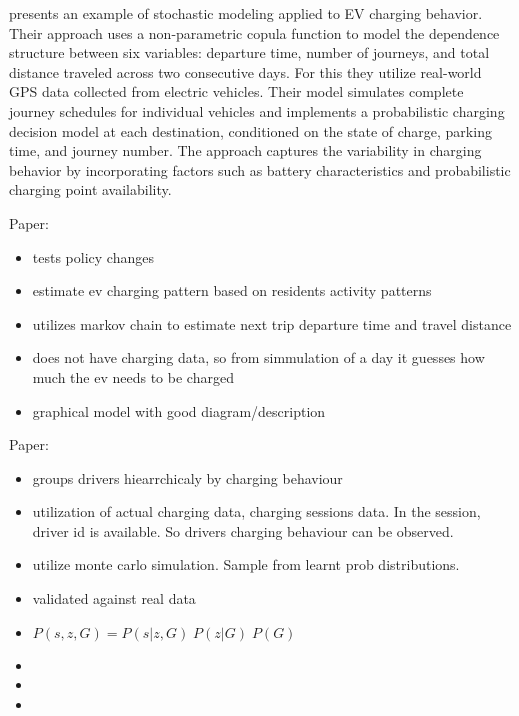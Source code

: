  presents an example of stochastic modeling applied to EV charging behavior. Their approach uses a non-parametric copula function to model the dependence structure between six variables: departure time, number of journeys, and total distance traveled across two consecutive days. For this they utilize real-world GPS data collected from electric vehicles. Their model simulates complete journey schedules for individual vehicles and implements a probabilistic charging decision model at each destination, conditioned on the state of charge, parking time, and journey number. The approach captures the variability in charging behavior by incorporating factors such as battery characteristics and probabilistic charging point availability.

Paper: 
\begin{itemize}
    \item tests policy changes
    \item estimate ev charging pattern based on residents activity patterns
    \item utilizes markov chain to estimate next trip departure time and travel distance
    \item does not have charging data, so from simmulation of a day it guesses how much the ev needs to be charged
    \item graphical model with good diagram/description
\end{itemize}



Paper: 
\begin{itemize}
    \item groups drivers hiearrchicaly by charging behaviour
    \item utilization of actual charging data, charging sessions data. In the session, driver id is available. So drivers charging behaviour can be observed.
    \item utilize monte carlo simulation. Sample from learnt prob distributions.
    \item validated against real data
    \item $P(s,z,G) = P(s|z,G)\;P(z|G)\;P(G)$
\end{itemize}


\begin{itemize}
    \item {}
    \item {}
    \item {}
\end{itemize}



